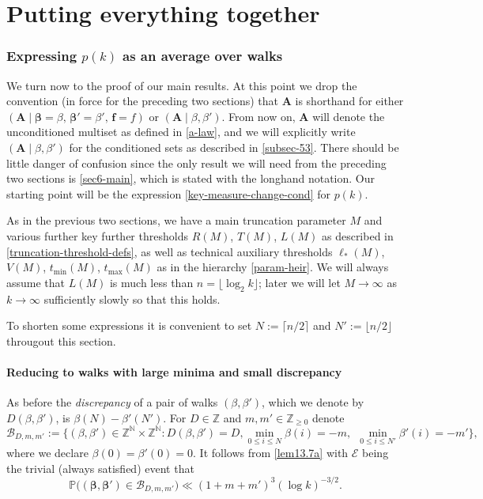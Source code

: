 \documentclass[11pt,reqno]{amsart}
\numberwithin{equation}{section}
\theoremstyle{definition}
\theoremstyle{remark}
\newcommand{\mb}{\mathbb}
\newcommand{\mbf}{\mathbf}
\def\boldbeta{\boldsymbol\beta}
\renewcommand{\le}{\leqslant}
\renewcommand{\ge}{\geqslant}
\newcommand\Z{\mathbb{Z}}
\newcommand\N{\mathbb{N}}
\begin{document}
\part{Putting everything together}\label{part4}

\section{Expressing \texorpdfstring{$p(k)$}{} as an average over walks}\label{sec:reduc-to-crit}

We turn now to the proof of our main results. At this point we drop the convention (in force for the preceding two sections) that $\mbf{A}$ is shorthand for either $(\mbf{A} \mid \boldbeta = \beta,\, \boldbeta' = \beta',\, \mathbf{f} = f)$ or $(\mbf{A} \mid \beta, \beta')$. From now on, $\mbf{A}$ will denote the unconditioned multiset as defined in \cref{a-law}, and we will explicitly write $(\mbf{A} \mid \beta, \beta')$ for the conditioned sets as described in \cref{subsec-53}. There should be little danger of confusion since the only result we will need from the preceding two sections is \cref{sec6-main}, which is stated with the longhand notation. Our starting point will be the expression \cref{key-measure-change-cond} for $p(k)$.

As in the previous two sections, we have a main truncation parameter $M$ and various further key further thresholds $R(M)$, $T(M)$, $L(M)$ as described in \cref{truncation-threshold-defs}, as well as technical auxiliary thresholds $\ell_*(M)$, $V(M)$, $t_{\min}(M)$, $t_{\max}(M)$ as in the hierarchy \cref{param-heir}. We will always assume that $L(M)$ is much less than $n = \lfloor \log_2 k\rfloor$; later we will let $M \rightarrow \infty$ as $k \rightarrow \infty$ sufficiently slowly so that this holds.

To shorten some expressions it is convenient to set $N := \lceil n/2\rceil$ and $N' := \lfloor n/2\rfloor$ througout this section.

\subsection{Reducing to walks with large minima and small discrepancy} 
As before the \emph{discrepancy} of a pair of walks $(\beta,\beta')$, which we denote by $D(\beta,\beta')$, is $\beta(N) - \beta'(N')$. For $D \in \Z$ and $m, m' \in \Z_{\ge 0}$ denote
\begin{equation} \mathscr{B}_{D, m, m'}  := \{ (\beta, \beta') \in \Z^{\N} \times \Z^{\N}  : D(\beta,\beta') = D,  \min_{0 \le i \le N} \beta(i) = -m,\, \; \min_{0 \le i \le N'} \beta'(i) = -m'\},\label{bdm-def}\end{equation} where we declare $\beta(0) = \beta'(0) = 0$. It follows from \cref{lem13.7a} with $\mathcal{E}$ being the trivial (always satisfied) event that
\begin{equation}\label{bdm-prob} \mb{P} \big( (\boldbeta,\boldbeta') \in \mathscr{B}_{D,m,m'} \big) \ll (1 + m + m')^{3} (\log k)^{-3/2}.\end{equation}
\end{document}
